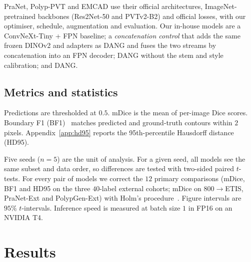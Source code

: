 \documentclass[10pt,twocolumn]{article}
\begin{document}
PraNet, Polyp-PVT and EMCAD use their official architectures, ImageNet-pretrained backbones (Res2Net-50 and PVTv2-B2) and official losses, with our optimiser, schedule, augmentation and evaluation. Our in-house models are a ConvNeXt-Tiny + FPN baseline; a \emph{concatenation control} that adds the same frozen DINOv2 and adapters as DANG and fuses the two streams by concatenation into an FPN decoder; DANG without the stem and style calibration; and DANG.

\subsection{Metrics and statistics}
\label{sec:stats}
Predictions are thresholded at $0.5$. mDice is the mean of per-image Dice scores. Boundary F1 (BF1)~\citep{csurka2013good} matches predicted and ground-truth contours within $2$ pixels. Appendix~\ref{app:hd95} reports the 95th-percentile Hausdorff distance (HD95).

Five seeds ($n=5$) are the unit of analysis. For a given seed, all models see the same subset and data order, so differences are tested with two-sided paired $t$-tests. For every pair of models we correct the $12$ primary comparisons (mDice, BF1 and HD95 on the three $40$-label external cohorts; mDice on $800\to$ETIS, PraNet-Ext and PolypGen-Ext) with Holm's procedure~\citep{holm1979simple}. Figure intervals are $95\%$ $t$-intervals. Inference speed is measured at batch size $1$ in FP16 on an NVIDIA T4.

\section{Results}
\end{document}
